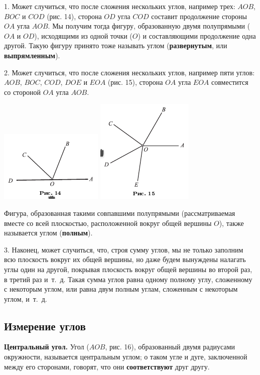 \documentclass[oneside]{book}
\begin{document}
1.
Может случиться, что после сложения нескольких углов, например трех:
$AOB$, $BOC$ и $COD$ (рис. 14), сторона $OD$ угла $COD$ составит продолжение стороны $OA$ угла $AOB$.
Мы получим тогда фигуру, образованную двумя полупрямыми ($OA$ и $OD$), исходящими из одной точки ($O$) и составляющими продолжение одна другой.
Такую фигуру принято тоже называть углом (\textbf{развернутым}, или \textbf{выпрямленным}).

2.
Может случиться, что после сложения нескольких углов, например пяти углов:
$AOB$, $BOC$, $COD$, $DOE$ и $EOA$ (рис. 15), сторона $OA$ угла $EOA$ совместится со стороной $OA$ угла $AOB$.

\includegraphics{pics/ris-14}
\includegraphics{pics/ris-15}

Фигура, образованная такими совпавшими полупрямыми (рассматриваемая вместе со всей плоскостью, расположенной вокруг общей вершины $O$), также называется углом (\textbf{полным}).


3.
Наконец, может случиться, что, строя сумму углов, мы не только заполним всю плоскость вокруг их общей вершины, но даже будем вынуждены налагать углы один на другой, покрывая плоскость вокруг общей вершины во второй раз, в третий раз и~т.~д.
Такая сумма углов равна одному полному углу, сложенному с некоторым углом, или равна двум полным углам, сложенным с некоторым углом, и~т.~д.

\subsection*{Измерение углов}

\textbf{Центральный угол.}
Угол ($AOB$, рис. 16), образованный двумя радиусами окружности, называется центральным углом;
о таком угле и дуге, заключенной между его сторонами, говорят, что они \textbf{соответствуют} друг другу.
\end{document}
